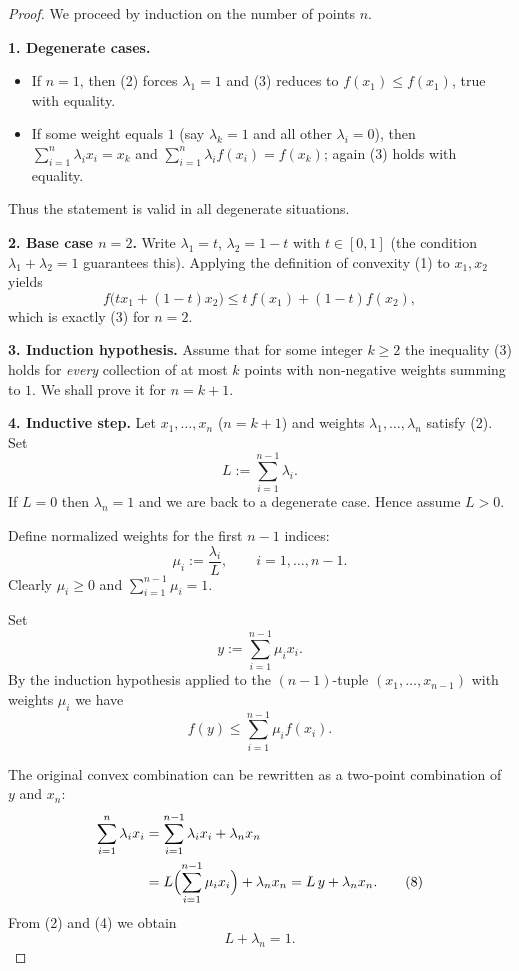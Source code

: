 \begin{proof}
We proceed by induction on the number of points \(n\).

\medskip\noindent\textbf{1. Degenerate cases.}
\begin{itemize}
\item If \(n=1\), then (2) forces \(\lambda_{1}=1\) and (3) reduces to
\(f(x_{1})\le f(x_{1})\), true with equality.
\item If some weight equals \(1\) (say \(\lambda_{k}=1\) and all other
\(\lambda_{i}=0\)), then
\(\sum_{i=1}^{n}\lambda_{i}x_{i}=x_{k}\) and
\(\sum_{i=1}^{n}\lambda_{i}f(x_{i})=f(x_{k})\); again (3) holds with
equality.
\end{itemize}
Thus the statement is valid in all degenerate situations.

\medskip\noindent\textbf{2. Base case \(n=2\).}
Write \(\lambda_{1}=t\), \(\lambda_{2}=1-t\) with \(t\in[0,1]\) (the
condition \(\lambda_{1}+\lambda_{2}=1\) guarantees this).  Applying the
definition of convexity (1) to \(x_{1},x_{2}\) yields
\[
f\bigl(t x_{1}+(1-t)x_{2}\bigr)\le t\,f(x_{1})+(1-t)f(x_{2}),
\]
which is exactly (3) for \(n=2\).

\medskip\noindent\textbf{3. Induction hypothesis.}
Assume that for some integer \(k\ge 2\) the inequality (3) holds for
\emph{every} collection of at most \(k\) points with non‑negative weights
summing to \(1\).  We shall prove it for \(n=k+1\).

\medskip\noindent\textbf{4. Inductive step.}
Let \(x_{1},\dots ,x_{n}\) (\(n=k+1\)) and weights \(\lambda_{1},\dots ,\lambda_{n}\)
satisfy (2).  Set
\[
L:=\sum_{i=1}^{n-1}\lambda_{i}. \tag{4}
\]
If \(L=0\) then \(\lambda_{n}=1\) and we are back to a degenerate case.
Hence assume \(L>0\).

Define normalized weights for the first \(n-1\) indices:
\[
\mu_{i}:=\frac{\lambda_{i}}{L},\qquad i=1,\dots ,n-1. \tag{5}
\]
Clearly \(\mu_{i}\ge0\) and \(\sum_{i=1}^{n-1}\mu_{i}=1\).

Set
\[
y:=\sum_{i=1}^{n-1}\mu_{i}x_{i}. \tag{6}
\]
By the induction hypothesis applied to the \((n-1)\)-tuple
\((x_{1},\dots ,x_{n-1})\) with weights \(\mu_{i}\) we have
\[
f(y)\le\sum_{i=1}^{n-1}\mu_{i}f(x_{i}). \tag{7}
\]

The original convex combination can be rewritten as a two‑point
combination of \(y\) and \(x_{n}\):
\begin{align*}
\sum_{i=1}^{n}\lambda_{i}x_{i}
   &=\sum_{i=1}^{n-1}\lambda_{i}x_{i}+\lambda_{n}x_{n} \\
   &=L\Bigl(\sum_{i=1}^{n-1}\mu_{i}x_{i}\Bigr)+\lambda_{n}x_{n}
    =L\,y+\lambda_{n}x_{n}. \tag{8}
\end{align*}
From (2) and (4) we obtain
\[
L+\lambda_{n}=1. \tag{9}
\]


\end{proof}
